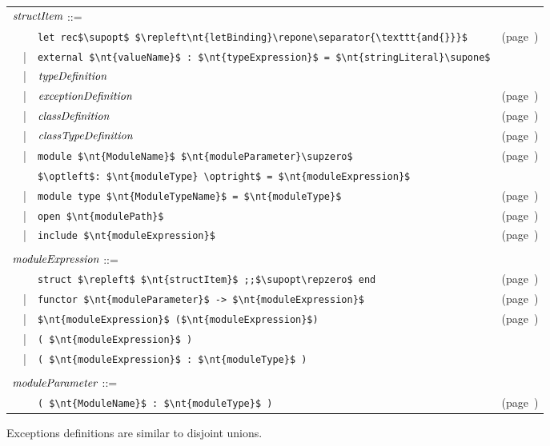 \begin{center}
\begin{tabular}{rcll}
\multicolumn{3}{l}{$\textit{\rmfamily structItem}$ ::=}\\
&   & \hbox{\lstinline/let rec$\supopt$ $\repleft\nt{letBinding}\repone\separator{\texttt{and{}}}$/} & (page~\pageref{keyword:let})\\
& | & \hbox{\lstinline/external $\nt{valueName}$ : $\nt{typeExpression}$ = $\nt{stringLiteral}\supone$/}\\
& | & $\textit{\rmfamily typeDefinition}$\\
& | & $\textit{\rmfamily exceptionDefinition}$ & (page~\pageref{keyword:exception})\\
& | & $\textit{\rmfamily classDefinition}$ & (page~\pageref{keyword:class})\\
& | & $\textit{\rmfamily classTypeDefinition}$ & (page~\pageref{classes:types})\\
& | & \hbox{\lstinline/module $\nt{ModuleName}$ $\nt{moduleParameter}\supzero$/} & (page~\pageref{keyword:module})\\
&   & \hbox{\lstinline/$\optleft$: $\nt{moduleType} \optright$ = $\nt{moduleExpression}$/}\\
& | & \hbox{\lstinline/module type $\nt{ModuleTypeName}$ = $\nt{moduleType}$/} & (page~\pageref{keyword:sig})\\
& | & \hbox{\lstinline/open $\nt{modulePath}$/} & (page~\pageref{keyword:open})\\
& | & \hbox{\lstinline/include $\nt{moduleExpression}$/} & (page~\pageref{keyword:include})\\
\\
\multicolumn{3}{l}{$\textit{\rmfamily moduleExpression}$ ::=}\\
&   & \hbox{\lstinline/struct $\repleft$ $\nt{structItem}$ ;;$\supopt\repzero$ end/} & (page~\pageref{keyword:struct})\\
& | & \hbox{\lstinline/functor $\nt{moduleParameter}$ -> $\nt{moduleExpression}$/} & (page~\pageref{keyword:functor})\\
& | & \hbox{\lstinline/$\nt{moduleExpression}$ ($\nt{moduleExpression}$)/} & (page~\pageref{modules:application})\\
& | & \hbox{\lstinline/( $\nt{moduleExpression}$ )/}\\
& | & \hbox{\lstinline/( $\nt{moduleExpression}$ : $\nt{moduleType}$ )/}\\
\\
\multicolumn{3}{l}{$\textit{\rmfamily moduleParameter}$ ::=}\\
&   & \hbox{\lstinline/( $\nt{ModuleName}$ : $\nt{moduleType}$ )/} & (page~\pageref{modules:application})
\end{tabular}
\end{center}
%
Exceptions definitions are similar to disjoint unions.

